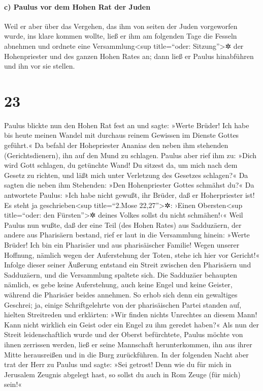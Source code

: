 \hypertarget{c-paulus-vor-dem-hohen-rat-der-juden}{%
\paragraph{c) Paulus vor dem Hohen Rat der
Juden}\label{c-paulus-vor-dem-hohen-rat-der-juden}}

 Weil er aber über das Vergehen, das ihm von seiten der
Juden vorgeworfen wurde, ins klare kommen wollte, ließ er ihm am
folgenden Tage die Fesseln abnehmen und ordnete eine
Versammlung\textless sup title=``oder: Sitzung''\textgreater✲ der
Hohenpriester und des ganzen Hohen Rates an; dann ließ er Paulus
hinabführen und ihn vor sie stellen.

\hypertarget{section-22}{%
\section{23}\label{section-22}}

 Paulus blickte nun den Hohen Rat fest an und sagte:
»Werte Brüder! Ich habe bis heute meinen Wandel mit durchaus reinem
Gewissen im Dienste Gottes geführt.«  Da befahl der
Hohepriester Ananias den neben ihm stehenden (Gerichtsdienern), ihn auf
den Mund zu schlagen.  Paulus aber rief ihm zu: »Dich wird
Gott schlagen, du getünchte Wand! Du sitzest da, um mich nach dem Gesetz
zu richten, und läßt mich unter Verletzung des Gesetzes schlagen?«
 Da sagten die neben ihm Stehenden: »Den Hohenpriester
Gottes schmähst du?«  Da antwortete Paulus: »Ich habe
nicht gewußt, ihr Brüder, daß er Hoherpriester ist! Es steht ja
geschrieben\textless sup title=``2.Mose 22,27''\textgreater✲: ›Einen
Obersten\textless sup title=``oder: den Fürsten''\textgreater✲ deines
Volkes sollst du nicht schmähen!‹«  Weil Paulus nun wußte,
daß der eine Teil (des Hohen Rates) aus Sadduzäern, der andere aus
Pharisäern bestand, rief er laut in die Versammlung hinein: »Werte
Brüder! Ich bin ein Pharisäer und aus pharisäischer Familie! Wegen
unserer Hoffnung, nämlich wegen der Auferstehung der Toten, stehe ich
hier vor Gericht!«  Infolge dieser seiner Äußerung
entstand ein Streit zwischen den Pharisäern und Sadduzäern, und die
Versammlung spaltete sich.  Die Sadduzäer behaupten
nämlich, es gebe keine Auferstehung, auch keine Engel und keine Geister,
während die Pharisäer beides annehmen.  So erhob sich denn
ein gewaltiges Geschrei; ja, einige Schriftgelehrte von der
pharisäischen Partei standen auf, hielten Streitreden und erklärten:
»Wir finden nichts Unrechtes an diesem Mann! Kann nicht wirklich ein
Geist oder ein Engel zu ihm geredet haben?«  Als nun der
Streit leidenschaftlich wurde und der Oberst befürchtete, Paulus möchte
von ihnen zerrissen werden, ließ er seine Mannschaft herunterkommen, ihn
aus ihrer Mitte herausreißen und in die Burg zurückführen.
 In der folgenden Nacht aber trat der Herr zu Paulus und
sagte: »Sei getrost! Denn wie du für mich in Jerusalem Zeugnis abgelegt
hast, so sollst du auch in Rom Zeuge (für mich) sein!«

